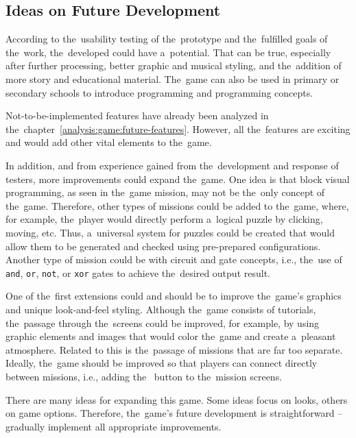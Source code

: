 \begin{conclusion}
\section{Ideas on Future Development}

According to the~usability testing of the~prototype and the~fulfilled goals of the~work, the~developed could have a~potential.
That can be true, especially after further processing, better graphic and musical styling, and the~addition of more story and educational material.
The~game can also be used in primary or secondary schools to introduce programming and programming concepts.

Not-to-be-implemented features have already been analyzed in the~chapter~\ref{analysis:game:future-features}.
However, all the~features are exciting and would add other vital elements to the~game.

In addition, and from experience gained from the~development and response of testers, more improvements could expand the~game.
One idea is that block visual programming, as seen in the~game mission, may not be the~only concept of the~game.
Therefore, other types of missions could be added to the~game, where, for example, the~player would directly perform a~logical puzzle by clicking, moving, etc.
Thus, a~universal system for puzzles could be created that would allow them to be generated and checked using pre-prepared configurations.
Another type of mission could be with circuit and gate concepts, i.e., the~use of \texttt{and}, \texttt{or}, \texttt{not}, or \texttt{xor} gates to achieve the~desired output result.

One of the~first extensions could and should be to improve the~game's graphics and unique look-and-feel styling.
Although the~game consists of tutorials, the~passage through the~screens could be improved, for example, by using graphic elements and images that would color the~game and create a~pleasant atmosphere.
Related to this is the~passage of missions that are far too separate.
Ideally, the~game should be improved so that players can connect directly between missions, i.e., adding the~ button to the~mission screens.

There are many ideas for expanding this game.
Some ideas focus on looks, others on game options.
Therefore, the~game's future development is straightforward -- gradually implement all appropriate improvements.

\end{conclusion}
